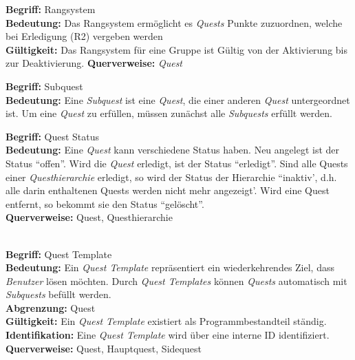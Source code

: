 \documentclass{article}
\begin{document}
\begin{samepage}
\textbf{Begriff:} Rangsystem\\
\textbf{Bedeutung:} Das Rangsystem ermöglicht es \textit{Quests} Punkte zuzuordnen, welche bei Erledigung (R2) vergeben werden\\ 
\textbf{Gültigkeit:} Das Rangsystem für eine Gruppe ist Gültig von der Aktivierung bis zur Deaktivierung.
\textbf{Querverweise:} \textit{Quest}\\
\end{samepage}


\begin{samepage}
\textbf{Begriff:} Subquest \\
\textbf{Bedeutung:} Eine \textit{Subquest} ist eine \textit{Quest}, die einer anderen \textit{Quest} untergeordnet ist. Um eine \textit{Quest} zu erfüllen, müssen zunächst alle \textit{Subquests} erfüllt werden. \\
\end{samepage}

\begin{samepage}
\textbf{Begriff:} Quest Status \\
\textbf{Bedeutung:} Eine \textit{Quest} kann verschiedene Status haben. Neu angelegt ist der Status ``offen''. Wird die \textit{Quest} erledigt, ist der Status ``erledigt''. Sind alle Quests einer \textit{Questhierarchie} erledigt, so wird der Status der Hierarchie ``inaktiv', d.h. alle darin enthaltenen Quests werden nicht mehr angezeigt'. Wird eine Quest entfernt, so bekommt sie den Status ``gelöscht''.\\
\textbf{Querverweise:} Quest,  Questhierarchie \\ \\
\end{samepage}

\begin{samepage}
\textbf{Begriff:} Quest Template \\
\textbf{Bedeutung:} Ein \textit{Quest Template} repräsentiert ein wiederkehrendes Ziel, dass \textit{Benutzer} lösen möchten. Durch \textit{Quest Templates} können \textit{Quests} automatisch mit \textit{Subquests} befüllt werden. \\
\textbf{Abgrenzung:} Quest \\
\textbf{Gültigkeit:} Ein \textit{Quest Template} existiert als Programmbestandteil ständig. \\
\textbf{Identifikation:} Eine \textit{Quest Template} wird über eine interne ID identifiziert. \\
\textbf{Querverweise:} Quest, Hauptquest, Sidequest \\ \\
\end{samepage}
\end{document}
